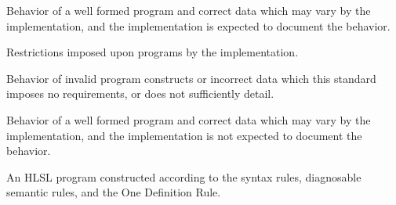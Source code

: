 \p Behavior of a well formed program and correct data which may vary by the
implementation, and the implementation is expected to document the behavior.

\p Restrictions imposed upon programs by the implementation.


\p Behavior of invalid program constructs or incorrect data which this standard
imposes no requirements, or does not sufficiently detail.

\p Behavior of a well formed program and correct data which may vary by the
implementation, and the implementation is not expected to document the behavior.

\p An HLSL program constructed according to the syntax rules, diagnosable
semantic rules, and the One Definition Rule.
